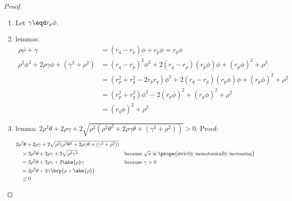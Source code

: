 \begin{proof}
\begin{enumerate}
  \item Let $\gamma \eqd r_p\phi$.
  \item lemmas: \label{item:larcR_lem}
    \begin{align*}
      \rho\phi+\gamma &= (r_q-r_p)\phi + r_p\phi = r_q\phi
      \\
      \rho^2\phi^2+2\rho\gamma\phi+(\gamma^2+\rho^2)
        &= (r_q-r_p)^2\phi^2 + 2(r_q-r_p)(r_p\phi)\phi+(r_p\phi)^2+\rho^2
      \\&= (r_p^2+r_q^2-2r_pr_q)\phi^2 + 2(r_q-r_p)(r_p\phi)\phi+(r_p\phi)^2+\rho^2
      \\&= (r_p^2+r_q^2)\phi^2 - 2(r_p\phi)^2 +(r_p\phi)^2+\rho^2
      \\&= (r_q\phi)^2+\rho^2
    \end{align*}

  \item lemma: \label{item:larcR_lnarg}
      $2\rho^2\theta+2\rho\gamma+2\sqrt{\rho^2(\rho^2\theta^2+2\rho\gamma\theta+(\gamma^2+\rho^2))} > 0$. Proof:
    \begin{align*}
      &2\rho^2\theta+2\rho\gamma+2\sqrt{\rho^2(\rho^2\theta^2+2\rho\gamma\theta+(\gamma^2+\rho^2))}
      \\&\quad>   2\rho^2\theta+2\rho\gamma+2\sqrt{\rho^2\gamma^2}
        &&        \text{because $\sqrt{x}$ is \prope{strictly monotonically increasing}}
      \\&\quad=   2\rho^2\theta+2\rho\gamma+2\abs{\rho}\gamma
        &&        \text{because $\gamma>0$}
      \\&\quad=   2\rho^2\theta+2\gamma\brp{\rho+\abs{\rho}}
      \\&\quad\ge 0
    \end{align*}


\end{enumerate}
\end{proof}
